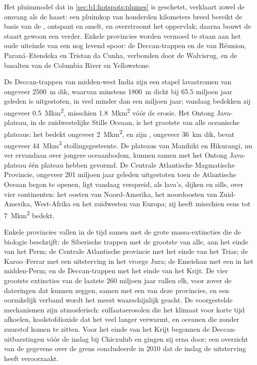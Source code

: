 \noindent Het pluimmodel dat in \cref{sec:b1:hotspots:plumes} is geschetst, verklaart zowel de omvang als de haast: een pluimkop van honderden kilometers breed bereikt de basis van de , ontspant en smelt, en overstroomt het oppervlak; daarna bouwt de staart gewoon een  verder. Enkele provincies worden vermoed te staan aan het oude uiteinde van een nog levend spoor: de Deccan-trappen en de  van Réunion, Paraná–Etendeka en Tristan da Cunha, verbonden door de Walvisrug, en de basalten van de Columbia River en Yellowstone.

De Deccan-trappen van midden-west India zijn een stapel lavastromen van ongeveer \qty{2500}{m} dik, waarvan minstens \qty{1800}{m} dicht bij 65.5 miljoen jaar geleden is uitgestoten, in veel minder dan een miljoen jaar; vandaag bedekken zij ongeveer \qty{0.5}{\mega km^2}, misschien \qty{1.8}{\mega km^2} vóór de erosie. Het Ontong Java-plateau, in de zuidwestelijke Stille Oceaan, is het grootste van alle oceanische plateaus: het bedekt ongeveer \qty{2}{\mega km^2}, en zijn , ongeveer \qty{36}{km} dik, bevat ongeveer \qty{44}{\mega km^3} stollingsgesteente. De plateaus van Manihiki en Hikurangi, nu ver ervandaan over jongere oceaanbodem, kunnen samen met het Ontong Java-plateau één plateau hebben gevormd. De Centrale Atlantische Magmatische Provincie, ongeveer 201 miljoen jaar geleden uitgestoten toen de Atlantische Oceaan begon te openen, ligt vandaag verspreid, als lava's, dijken en sills, over vier continenten: het oosten van Noord-Amerika, het noordoosten van Zuid-Amerika, West-Afrika en het zuidwesten van Europa; zij heeft misschien eens tot \qty{7}{\mega km^2} bedekt.


Enkele provincies vallen in de tijd samen met de grote massa-extincties die de biologie beschrijft: de Siberische trappen met de grootste van alle, aan het einde van het Perm; de Centrale Atlantische provincie met het einde van het Trias; de Karoo–Ferrar met een uitsterving in het vroege Jura; de Emeishan met een in het midden-Perm; en de Deccan-trappen met het einde van het Krijt. De vier grootste extincties van de laatste 260 miljoen jaar vallen elk, voor zover de dateringen dat kunnen zeggen, samen met een van deze provincies, en een oorzakelijk verband wordt het meest waarschijnlijk geacht. De voorgestelde mechanismen zijn atmosferisch: sulfaataerosolen die het klimaat voor korte tijd afkoelen, koolstofdioxide dat het veel langer verwarmt, en oceanen die zonder zuurstof komen te zitten. Voor het einde van het Krijt begonnen de Deccan-uitbarstingen vóór de inslag bij Chicxulub en gingen zij erna door; een overzicht van de gegevens over de grens concludeerde in 2010 dat de inslag de uitsterving heeft veroorzaakt.

